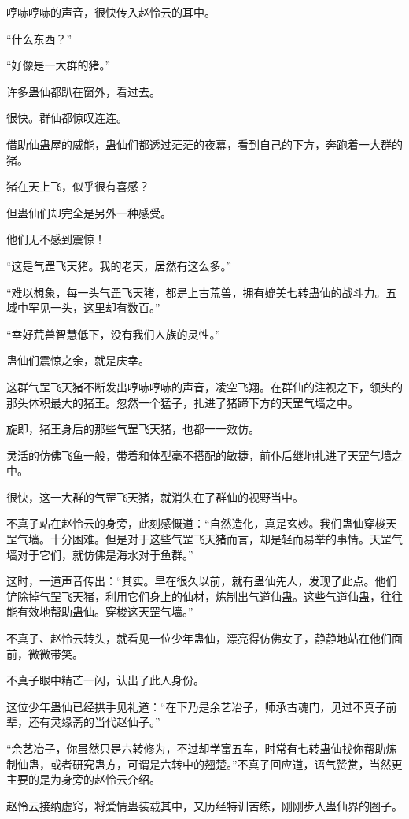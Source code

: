 \begin{this_body}
哼哧哼哧的声音，很快传入赵怜云的耳中。

“什么东西？”

“好像是一大群的猪。”

许多蛊仙都趴在窗外，看过去。

很快。群仙都惊叹连连。

借助仙蛊屋的威能，蛊仙们都透过茫茫的夜幕，看到自己的下方，奔跑着一大群的猪。

猪在天上飞，似乎很有喜感？

但蛊仙们却完全是另外一种感受。

他们无不感到震惊！

“这是气罡飞天猪。我的老天，居然有这么多。”

“难以想象，每一头气罡飞天猪，都是上古荒兽，拥有媲美七转蛊仙的战斗力。五域中罕见一头，这里却有数百。”

“幸好荒兽智慧低下，没有我们人族的灵性。”

蛊仙们震惊之余，就是庆幸。

这群气罡飞天猪不断发出哼哧哼哧的声音，凌空飞翔。在群仙的注视之下，领头的那头体积最大的猪王。忽然一个猛子，扎进了猪蹄下方的天罡气墙之中。

旋即，猪王身后的那些气罡飞天猪，也都一一效仿。

灵活的仿佛飞鱼一般，带着和体型毫不搭配的敏捷，前仆后继地扎进了天罡气墙之中。

很快，这一大群的气罡飞天猪，就消失在了群仙的视野当中。

不真子站在赵怜云的身旁，此刻感慨道：“自然造化，真是玄妙。我们蛊仙穿梭天罡气墙。十分困难。但是对于这些气罡飞天猪而言，却是轻而易举的事情。天罡气墙对于它们，就仿佛是海水对于鱼群。”

这时，一道声音传出：“其实。早在很久以前，就有蛊仙先人，发现了此点。他们铲除掉气罡飞天猪，利用它们身上的仙材，炼制出气道仙蛊。这些气道仙蛊，往往能有效地帮助蛊仙。穿梭这天罡气墙。”

不真子、赵怜云转头，就看见一位少年蛊仙，漂亮得仿佛女子，静静地站在他们面前，微微带笑。

不真子眼中精芒一闪，认出了此人身份。

这位少年蛊仙已经拱手见礼道：“在下乃是余艺冶子，师承古魂门，见过不真子前辈，还有灵缘斋的当代赵仙子。”

“余艺冶子，你虽然只是六转修为，不过却学富五车，时常有七转蛊仙找你帮助炼制仙蛊，或者研究蛊方，可谓是六转中的翘楚。”不真子回应道，语气赞赏，当然更主要的是为身旁的赵怜云介绍。

赵怜云接纳虚窍，将爱情蛊装载其中，又历经特训苦练，刚刚步入蛊仙界的圈子。


\end{this_body}
